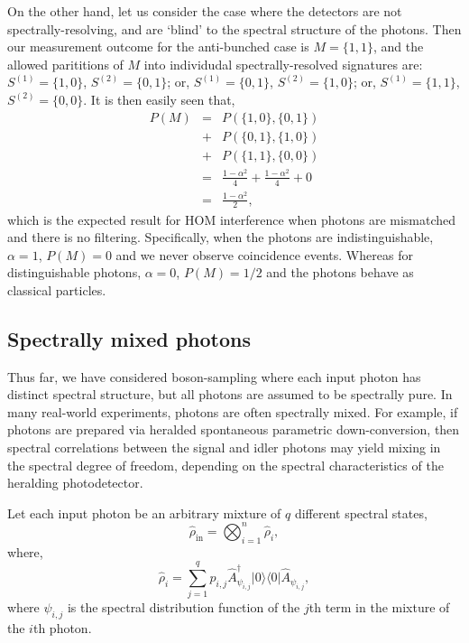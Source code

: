 \documentclass[aps,pra,twocolumn,amsmath,amssymb,nofootinbib,superscriptaddress]{revtex4}
\newcommand{\bra}[1]{\langle#1|}
\newcommand{\ket}[1]{|#1\rangle}
\begin{document}
On the other hand, let us consider the case where the detectors are not spectrally-resolving, and are `blind' to the spectral structure of the photons. Then our measurement outcome for the anti-bunched case is \mbox{$M=\{1,1\}$}, and the allowed parititions of $M$ into individudal spectrally-resolved signatures are: \mbox{$S^{(1)}=\{1,0\}$}, \mbox{$S^{(2)}=\{0,1\}$}; or, \mbox{$S^{(1)}=\{0,1\}$}, \mbox{$S^{(2)}=\{1,0\}$}; or, \mbox{$S^{(1)}=\{1,1\}$}, \mbox{$S^{(2)}=\{0,0\}$}. It is then easily seen that,
\begin{eqnarray}
P(M) &=& P(\{1,0\},\{0,1\}) \nonumber \\
&+& P(\{0,1\},\{1,0\}) \nonumber \\
&+& P(\{1,1\},\{0,0\}) \\ \nonumber
&=& \frac{1-\alpha^2}{4} + \frac{1-\alpha^2}{4} + 0 \nonumber \\
&=& \frac{1-\alpha^2}{2},
\end{eqnarray}
which is the expected result for HOM interference when photons are mismatched and there is no filtering. Specifically, when the photons are indistinguishable, \mbox{$\alpha=1$}, \mbox{$P(M)=0$} and we never observe coincidence events. Whereas for distinguishable photons, \mbox{$\alpha=0$}, \mbox{$P(M)=1/2$} and the photons behave as classical particles.

%
%

\subsection{Spectrally mixed photons}

Thus far, we have considered boson-sampling where each input photon has distinct spectral structure, but all photons are assumed to be spectrally pure. In many real-world experiments, photons are often spectrally mixed. For example, if photons are prepared via heralded spontaneous parametric down-conversion, then spectral correlations between the signal and idler photons may yield mixing in the spectral degree of freedom, depending on the spectral characteristics of the heralding photodetector.

Let each input photon be an arbitrary mixture of $q$ different spectral states,
\begin{equation}
\hat\rho_\mathrm{in} = \bigotimes_{i=1}^n \hat\rho_i,
\end{equation}
where,
\begin{equation}
\hat\rho_i = \sum_{j=1}^q p_{i,j} \hat{A}_{\psi_{i,j}}^\dag \ket{0}\bra{0} \hat{A}_{\psi_{i,j}},
\end{equation}
where
\mbox{$\psi_{i,j}$} is the spectral distribution function of the $j$th term in the mixture of the $i$th photon.
\end{document}
